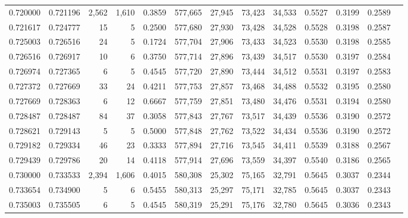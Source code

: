 \begin{tabular}{rrrrrrrrrrrrr}
0.720000 & 0.721196 &  2,562 & 1,610 &                                     0.3859 & 577,665 &  27,945 &  73,423 &  34,533 & 0.5527 & 0.3199 & 0.2589 \\
0.721617 & 0.724777 &     15 &     5 &                                     0.2500 & 577,680 &  27,930 &  73,428 &  34,528 & 0.5528 & 0.3198 & 0.2587 \\
0.725003 & 0.726516 &     24 &     5 &                                     0.1724 & 577,704 &  27,906 &  73,433 &  34,523 & 0.5530 & 0.3198 & 0.2585 \\
0.726516 & 0.726917 &     10 &     6 &                                     0.3750 & 577,714 &  27,896 &  73,439 &  34,517 & 0.5530 & 0.3197 & 0.2584 \\
0.726974 & 0.727365 &      6 &     5 &                                     0.4545 & 577,720 &  27,890 &  73,444 &  34,512 & 0.5531 & 0.3197 & 0.2583 \\
0.727372 & 0.727669 &     33 &    24 &                                     0.4211 & 577,753 &  27,857 &  73,468 &  34,488 & 0.5532 & 0.3195 & 0.2580 \\
0.727669 & 0.728363 &      6 &    12 &                                     0.6667 & 577,759 &  27,851 &  73,480 &  34,476 & 0.5531 & 0.3194 & 0.2580 \\
0.728487 & 0.728487 &     84 &    37 &                                     0.3058 & 577,843 &  27,767 &  73,517 &  34,439 & 0.5536 & 0.3190 & 0.2572 \\
0.728621 & 0.729143 &      5 &     5 &                                     0.5000 & 577,848 &  27,762 &  73,522 &  34,434 & 0.5536 & 0.3190 & 0.2572 \\
0.729182 & 0.729334 &     46 &    23 &                                     0.3333 & 577,894 &  27,716 &  73,545 &  34,411 & 0.5539 & 0.3188 & 0.2567 \\
0.729439 & 0.729786 &     20 &    14 &                                     0.4118 & 577,914 &  27,696 &  73,559 &  34,397 & 0.5540 & 0.3186 & 0.2565 \\
0.730000 & 0.733533 &  2,394 & 1,606 &                                     0.4015 & 580,308 &  25,302 &  75,165 &  32,791 & 0.5645 & 0.3037 & 0.2344 \\
0.733654 & 0.734900 &      5 &     6 &                                     0.5455 & 580,313 &  25,297 &  75,171 &  32,785 & 0.5645 & 0.3037 & 0.2343 \\
0.735003 & 0.735505 &      6 &     5 &                                     0.4545 & 580,319 &  25,291 &  75,176 &  32,780 & 0.5645 & 0.3036 & 0.2343 \\

\end{tabular}
